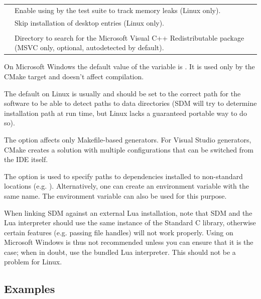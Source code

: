 \documentclass[a4paper,12pt,twoside,extrafontsizes]{memoir}
\begin{document}
\begin{table}[htbp]
\begin{tabularx}{\textwidth}{lL}
 & Enable using  by the test suite to track memory leaks (Linux only). \\

 & Skip installation of desktop entries (Linux only). \\

\midrule
{}\\
\midrule

 & Directory to search for the Microsoft Visual C++ Redistributable package (MSVC only, optional, autodetected by default).\\

\bottomrule
\end{tabularx}
\end{table}

On Microsoft Windows the default value of the  variable is . It is used only by the CMake  target and doesn't affect compilation.

The default  on Linux is usually  and should be set to the correct path for the software to be able to detect paths to data directories (SDM will try to determine installation path at run time, but Linux lacks a guaranteed portable way to do so).

The  option affects only Makefile-based generators. For Visual Studio generators, CMake creates a solution with multiple configurations that can be switched from the IDE itself.

The  option is used to specify paths to dependencies installed to non-standard locations (e.g. ). Alternatively, one can create an environment variable with the same name. The  environment variable can also be used for this purpose.

When linking SDM against an external Lua installation, note that SDM and the Lua interpreter should use the same instance of the Standard C library, otherwise certain features (e.g. passing file handles) will not work properly. Using  on Microsoft Windows is thus not recommended unless you can ensure that it is the case; when in doubt, use the bundled Lua interpreter. This should not be a problem for Linux.

\subsection{Examples}
\end{document}
